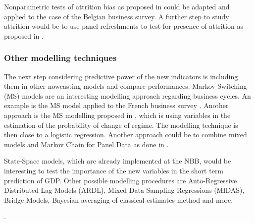 \documentclass[12pt,a4paper,oneside]{book}
\begin{document}
Nonparametric tests of attrition bias as proposed in \cite{das_nonparametric_2011} could be adapted and applied to the case of the Belgian business survey.
A further step to study attrition would be to use panel refreshments to test for presence of attrition as proposed in \cite{van_landeghem_test_2014}.





\subsubsection{Other modelling techniques}

The next step considering predictive power of the new indicators is including them in other nowcasting models and compare performances. 
Markov Switching (MS) models \citep{hamilton_new_1989} are an interesting modelling approach regarding business cycles. An example is the MS model applied to the French business survey \cite{bardaji_constructing_2009}.
Another approach is the MS modelling proposed in \cite{duprey_how_2017}, which is using variables in the estimation of the probability of change of regime. The modelling technique is then close to a logistic regression. 
Another approach could be to combine mixed models and Markov Chain for Panel Data as done in \cite{de_haan-rietdijk_use_2017}.

State-Space models, which are already implemented at the NBB, would be interesting to test the importance of the new variables in the short term prediction of GDP.
Other possible modelling procedures are Auto-Regressive Distributed Lag Models (ARDL), 
Mixed Data Sampling Regressions (MIDAS), 
Bridge Models,
Bayesian averaging of classical estimates method \citep{bialowolski_bayesian_2014}
and more.

\nocite{foroni_comparison_2014}.
\end{document}
